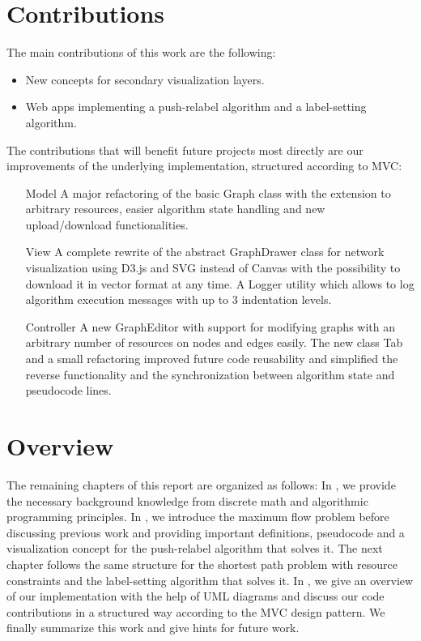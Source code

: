 \section{Contributions}
The main contributions of this work are the following:
\begin{itemize}
	\item New concepts for secondary visualization layers.
	\item Web apps implementing a push-relabel algorithm and a label-setting algorithm.
\end{itemize}
The contributions that will benefit future projects most directly are our improvements of the underlying implementation, structured according to MVC:
\begin{itemize}
	\item[Model] A major refactoring of the basic Graph class with the extension to arbitrary resources, easier algorithm state handling and new upload/download functionalities.
	\item[View] A complete rewrite of the abstract GraphDrawer class for network visualization using D3.js and SVG instead of Canvas with the possibility to download it in vector format at any time. A Logger utility which allows to log algorithm execution messages with up to 3 indentation levels.
	\item[Controller] A new GraphEditor with support for modifying graphs with an arbitrary number of resources on nodes and edges easily. The new class Tab and a small refactoring improved future code reusability and simplified the reverse functionality and the synchronization between algorithm state and pseudocode lines.
\end{itemize}


\section{Overview}
The remaining chapters of this report are organized as follows: In , we provide the necessary background knowledge from discrete math and algorithmic programming principles. In , we introduce the maximum flow problem before discussing  previous work and providing important definitions, pseudocode and a visualization concept for the push-relabel algorithm that solves it. The next chapter  follows the same structure for the shortest path problem with resource constraints and the label-setting algorithm that solves it. In , we give an overview of our implementation with the help of UML diagrams and discuss our code contributions in a structured way according to the MVC design pattern. We finally  summarize this work and give hints for future work.

